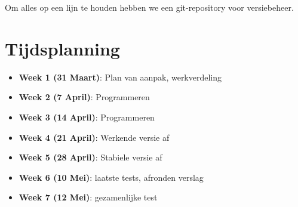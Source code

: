 \documentclass[a4paper,10pt]{article}
\begin{document}
Om alles op een lijn te houden hebben we een git-repository voor versiebeheer.



  \section{Tijdsplanning}
  \begin{itemize}
    \item \textbf{Week 1 (31 Maart)}: Plan van aanpak, werkverdeling
    \item \textbf{Week 2 (7 April)}: Programmeren
    \item \textbf{Week 3 (14 April)}: Programmeren
    \item \textbf{Week 4 (21 April)}: Werkende versie af
    \item \textbf{Week 5 (28 April)}: Stabiele versie af
    \item \textbf{Week 6 (10 Mei)}: laatste tests, afronden verslag
    \item \textbf{Week 7 (12 Mei)}: gezamenlijke test

  \end{itemize}
\end{document}
